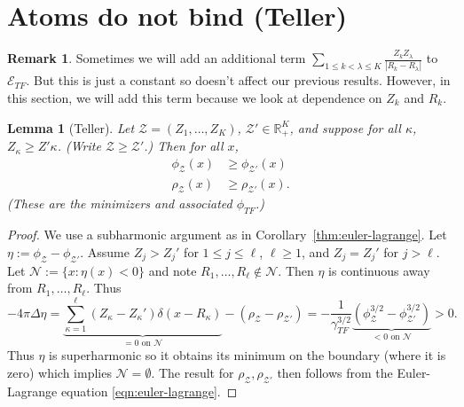 \documentclass[11pt]{amsart}
\newcommand{\R}{\mathbb{R}}
\newtheorem{lem}{Lemma}
\theoremstyle{definition}
\theoremstyle{definition}
\theoremstyle{definition}
\newtheorem*{rmk}{Remark}
\numberwithin{equation}{section}
\begin{document}
\section{Atoms do not bind (Teller)}
\begin{rmk}
Sometimes we will add an additional term $\sum_{1\le k<\lambda\le K}\frac{Z_kZ_\lambda}{|R_k-R_\lambda|}$ to $\mathcal{E}_{TF}$. But this is just a constant so doesn't affect our previous results. However, in this section, we will add this term because we look at dependence on $Z_k$ and $R_k$.
\end{rmk}

\begin{lem}[Teller]
Let $\mathcal{Z}=(Z_1,\ldots,Z_K)$, $\mathcal{Z}'\in\R_+^K$, and suppose for all $\kappa$, $Z_\kappa\ge Z'\kappa$. (Write $\mathcal{Z}\ge\mathcal{Z}'$.) Then for all $x$,
\begin{align}
\phi_\mathcal{Z}(x)&\ge\phi_{\mathcal{Z}'}(x)\\
\rho_\mathcal{Z}(x)&\ge\rho_{\mathcal{Z}'}(x).
\end{align}
(These are the minimizers and associated $\phi_{TF}$.)
\end{lem}
\begin{proof}
We use a subharmonic argument as in Corollary~\ref{thm:euler-lagrange}.
Let $\eta:=\phi_\mathcal{Z}-\phi_{\mathcal{Z'}}$. Assume $Z_j>Z_j'$ for $1\le j\le \ell$, $\ell\ge1$, and $Z_j=Z_j'$ for $j>\ell$. Let $\mathcal{N}:=\{x:\eta(x)<0\}$ and note $R_1,\ldots,R_\ell\not\in\mathcal{N}$. Then $\eta$ is continuous away from $R_1,\ldots,R_\ell$. Thus
\[
-4\pi\Delta\eta=\underbrace{\sum_{\kappa=1}^{\ell}(Z_\kappa-Z_\kappa')\delta(x-R_\kappa)}_{=0\text{ on }\mathcal{N}}-(\rho_\mathcal{Z}-\rho_{\mathcal{Z}'})=-\frac{1}{\gamma_{TF}^{3/2}}\underbrace{(\phi_\mathcal{Z}^{3/2}-\phi_{\mathcal{Z}'}^{3/2})}_{<0\text{ on }\mathcal{N}}>0.
\]
Thus $\eta$ is superharmonic so it obtains its minimum on the boundary (where it is zero) which implies $\mathcal{N}=\emptyset$. The result for $\rho_\mathcal{Z},\rho_\mathcal{Z'}$ then follows from the Euler-Lagrange equation \eqref{eqn:euler-lagrange}.
\end{proof}
\end{document}
